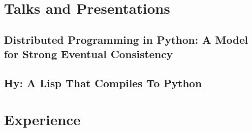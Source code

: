 \documentclass[11pt,a4paper,sans]{moderncv}   %
\begin{document}
\section{Talks and Presentations}
\subsection{Distributed Programming in Python: A Model for Strong Eventual
Consistency}
\subsection{Hy: A Lisp That Compiles To Python}

\section{Experience}
\end{document}
